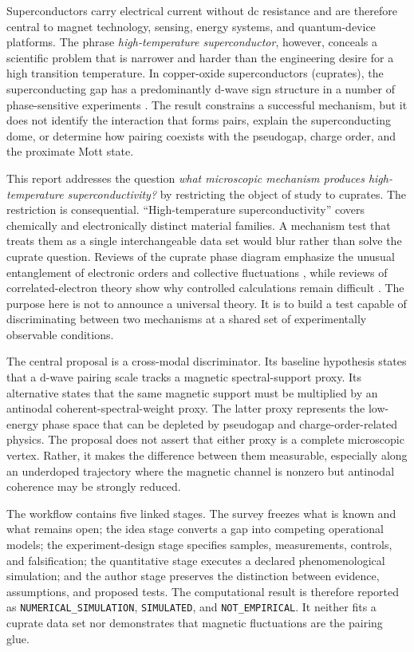 \documentclass[conference]{IEEEtran}
\begin{document}
Superconductors carry electrical current without dc resistance and are therefore central to magnet technology, sensing, energy systems, and quantum-device platforms. The phrase \emph{high-temperature superconductor}, however, conceals a scientific problem that is narrower and harder than the engineering desire for a high transition temperature. In copper-oxide superconductors (cuprates), the superconducting gap has a predominantly d-wave sign structure in a number of phase-sensitive experiments \cite{tsuei2000}. The result constrains a successful mechanism, but it does not identify the interaction that forms pairs, explain the superconducting dome, or determine how pairing coexists with the pseudogap, charge order, and the proximate Mott state.

This report addresses the question \emph{what microscopic mechanism produces high-temperature superconductivity?} by restricting the object of study to cuprates. The restriction is consequential. ``High-temperature superconductivity'' covers chemically and electronically distinct material families. A mechanism test that treats them as a single interchangeable data set would blur rather than solve the cuprate question. Reviews of the cuprate phase diagram emphasize the unusual entanglement of electronic orders and collective fluctuations \cite{keimer2015}, while reviews of correlated-electron theory show why controlled calculations remain difficult \cite{lee2006,leblanc2015}. The purpose here is not to announce a universal theory. It is to build a test capable of discriminating between two mechanisms at a shared set of experimentally observable conditions.

The central proposal is a cross-modal discriminator. Its baseline hypothesis states that a d-wave pairing scale tracks a magnetic spectral-support proxy. Its alternative states that the same magnetic support must be multiplied by an antinodal coherent-spectral-weight proxy. The latter proxy represents the low-energy phase space that can be depleted by pseudogap and charge-order-related physics. The proposal does not assert that either proxy is a complete microscopic vertex. Rather, it makes the difference between them measurable, especially along an underdoped trajectory where the magnetic channel is nonzero but antinodal coherence may be strongly reduced.

The workflow contains five linked stages. The survey freezes what is known and what remains open; the idea stage converts a gap into competing operational models; the experiment-design stage specifies samples, measurements, controls, and falsification; the quantitative stage executes a declared phenomenological simulation; and the author stage preserves the distinction between evidence, assumptions, and proposed tests. The computational result is therefore reported as \texttt{NUMERICAL\_SIMULATION}, \texttt{SIMULATED}, and \texttt{NOT\_EMPIRICAL}. It neither fits a cuprate data set nor demonstrates that magnetic fluctuations are the pairing glue.
\end{document}
